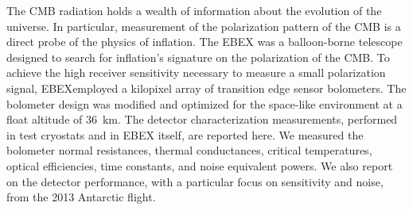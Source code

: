 
The \ac{CMB} radiation holds a wealth of information about the evolution of the universe. 
In particular, measurement of the polarization pattern of the \ac{CMB} is a direct probe of the physics of inflation. 
The \ac{EBEX} was a balloon-borne telescope designed to search for inflation's signature on the polarization of the \ac{CMB}.  
To achieve the high receiver sensitivity necessary to measure a small polarization signal, \ac{EBEX}employed a kilopixel array of transition edge sensor bolometers. 
The bolometer design was modified and optimized for the space-like environment at a float altitude of 36~km. 
The detector characterization measurements, performed in test cryostats and in \ac{EBEX} itself, are reported here. 
We measured the bolometer normal resistances, thermal conductances, critical temperatures, optical efficiencies, time constants, and noise equivalent powers. 
We also report on the detector performance, with a particular focus on sensitivity and noise, from the 2013 Antarctic flight.



